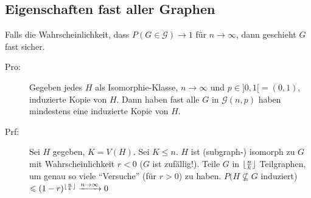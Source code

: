 \subsection{Eigenschaften fast aller Graphen}
Falls die Wahrscheinlichkeit, dass $P(G \in \mathcal{G}) \rightarrow 1$ für $n \rightarrow \infty$, dann geschieht $G$ fast sicher.
\begin{description}
    \item[Pro:] Gegeben jedes $H$ als Isomorphie-Klasse, $n \rightarrow \infty$ und $p \in ]0,1[ = (0,1)$, induzierte Kopie von $H$. 
    Dann haben fast alle $G$ in $\mathcal{G}(n,p)$ haben mindestens eine induzierte Kopie von $H$.
    \item[Prf:] Sei $H$ gegeben, $K=V(H)$. Sei $K \leqslant n$. $H$ ist (subgraph-) isomorph zu $G$ mit Wahrscheinlichkeit $r < 0$ ($G$ ist zufällig!). 
        Teile $G$ in $\lfloor {n \over k} \rfloor$ Teilgraphen, um genau so viele ``Versuche'' (für $r > 0$) zu haben. 
        $P(H \not \subseteq G$ induziert) $\leqslant (1-r)^{\lfloor {n \over k} \rfloor} \xrightarrow{n \rightarrow \infty} 0$
\end{description}
